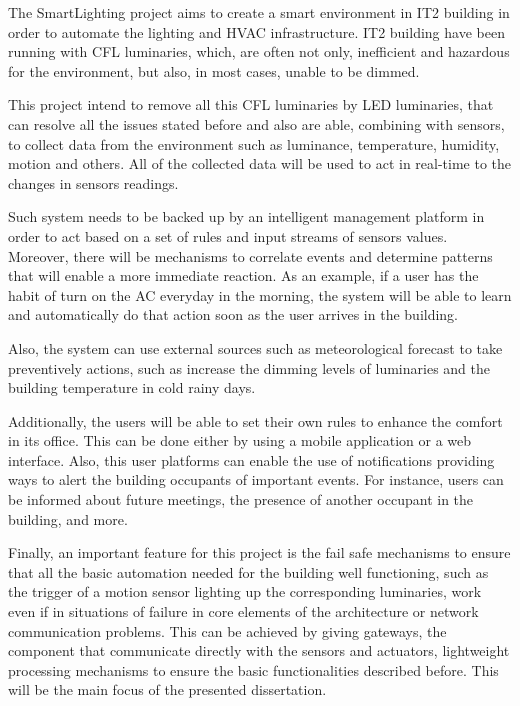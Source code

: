 The SmartLighting project aims to create a smart environment in IT2 building in order to automate the lighting and HVAC infrastructure. IT2 building have been running with CFL luminaries, which, are often not only, inefficient and hazardous for the environment, but also, in most cases, unable to be dimmed. 

This project intend to remove all this CFL luminaries by LED luminaries, that can resolve all the issues stated before and also are able, combining with sensors, to collect data from the environment such as luminance, temperature, humidity, motion and others. All of the collected data will be used to act in real-time to the changes in sensors readings. 

Such system needs to be backed up by an intelligent management platform in order to act based on a set of rules and input streams of sensors values. Moreover, there will be mechanisms to correlate events and determine patterns that will enable a more immediate reaction. As an example, if a user has the habit of turn on the AC everyday in the morning, the system will be able to learn and automatically do that action soon as the user arrives in the building. 

Also, the system can use external sources such as meteorological forecast to take preventively actions, such as increase the dimming levels of luminaries and the building temperature in cold rainy days.

Additionally, the users will be able to set their own rules to enhance the comfort in its office. This can be done either by using a mobile application or a web interface. Also, this user platforms can enable the use of notifications providing ways to alert the building occupants of important events. For instance, users can be informed about future meetings, the presence of another occupant in the building, and more.

Finally, an important feature for this project is the fail safe mechanisms to ensure that all the basic automation needed for the building well functioning, such as the trigger of a motion sensor lighting up the corresponding luminaries, work even if in situations of failure in core elements of the architecture or network communication problems. This can be achieved by giving gateways, the component that communicate directly with the sensors and actuators, lightweight processing mechanisms to ensure the basic functionalities described before. This will be the main focus of the presented dissertation.


